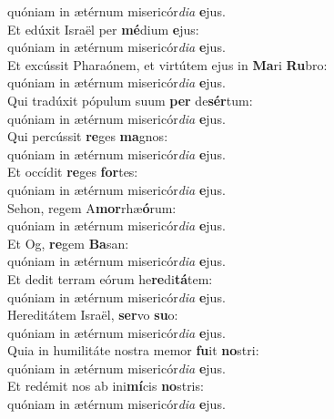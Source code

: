 \oddverse quóniam in ætérnum misericór\textit{di}\textit{a} \textbf{e}jus.\\
\evenverse Et edúxit Israël per \textbf{mé}dium \textbf{e}jus:~\*\\
\evenverse quóniam in ætérnum misericór\textit{di}\textit{a} \textbf{e}jus.\\
\oddverse Et excússit Pharaónem, et virtútem ejus in \textbf{Ma}ri \textbf{Ru}bro:~\*\\
\oddverse quóniam in ætérnum misericór\textit{di}\textit{a} \textbf{e}jus.\\
\evenverse Qui tradúxit pópulum suum \textbf{per} de\textbf{sér}tum:~\*\\
\evenverse quóniam in ætérnum misericór\textit{di}\textit{a} \textbf{e}jus.\\
\oddverse Qui percússit \textbf{re}ges \textbf{ma}gnos:~\*\\
\oddverse quóniam in ætérnum misericór\textit{di}\textit{a} \textbf{e}jus.\\
\evenverse Et occídit \textbf{re}ges \textbf{for}tes:~\*\\
\evenverse quóniam in ætérnum misericór\textit{di}\textit{a} \textbf{e}jus.\\
\oddverse Sehon, regem A\textbf{mor}rhæ\textbf{ó}rum:~\*\\
\oddverse quóniam in ætérnum misericór\textit{di}\textit{a} \textbf{e}jus.\\
\evenverse Et Og, \textbf{re}gem \textbf{Ba}san:~\*\\
\evenverse quóniam in ætérnum misericór\textit{di}\textit{a} \textbf{e}jus.\\
\oddverse Et dedit terram eórum he\textbf{re}di\textbf{tá}tem:~\*\\
\oddverse quóniam in ætérnum misericór\textit{di}\textit{a} \textbf{e}jus.\\
\evenverse Hereditátem Israël, \textbf{ser}vo \textbf{su}o:~\*\\
\evenverse quóniam in ætérnum misericór\textit{di}\textit{a} \textbf{e}jus.\\
\oddverse Quia in humilitáte nostra memor \textbf{fu}it \textbf{no}stri:~\*\\
\oddverse quóniam in ætérnum misericór\textit{di}\textit{a} \textbf{e}jus.\\
\evenverse Et redémit nos ab ini\textbf{mí}cis \textbf{no}stris:~\*\\
\evenverse quóniam in ætérnum misericór\textit{di}\textit{a} \textbf{e}jus.\\
